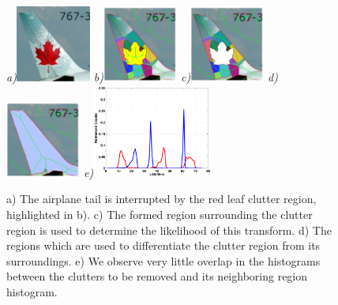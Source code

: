 \begin{figure}[ht]
\centering
{\footnotesize\textit{a)}}\includegraphics[width=0.22\textwidth]{figs/plane_crop.png}
{\footnotesize\textit{b)}}\includegraphics[width=0.22\textwidth]{figs/plane_cost_base.pdf}
{\footnotesize\textit{c)}}\includegraphics[width=0.22\textwidth]{figs/plane_cost_without_region.pdf}
{\footnotesize\textit{d)}}\includegraphics[width=0.22\textwidth]{figs/plane_final.pdf}
{\footnotesize\textit{e)}}\includegraphics[width=0.35\textwidth]{figs/lab_hist.pdf}
\caption{a) The airplane tail is interrupted by the red leaf clutter region, highlighted in b). c) The formed region surrounding the clutter region is used to determine the likelihood of this transform. d) The regions which are used to differentiate the clutter region from its surroundings. e) We observe very little overlap in the histograms between the clutters to be removed and its neighboring region histogram.  }
\label{fig:rc_cost}
\end{figure}

